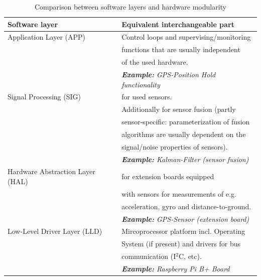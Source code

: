 \begin{table}[H]	
	\begin{tabular}{l|l}
		\hline
		\textbf{Software layer} 					& \textbf{Equivalent interchangeable part} \\
		\hline
		Application Layer (APP) 					& Control loops and supervising/monitoring\\
																			& functions that are usually independent\\
																			& of the used hardware.\\
																			& \textit{\textbf{Example:} GPS-Position Hold functionality}\\
		\hline
		Signal Processing (SIG) 					& \textemphs{Signal conditioning} for used sensors. \\
																			& Additionally for sensor fusion (partly \\
																			& sensor-specific: parameterization of fusion\\
																			& algorithms are usually dependent on the\\
																			& signal/noise properties of sensors).\\
																			& \textit{\textbf{Example:} Kalman-Filter (sensor fusion)}\\			
		\hline
		Hardware Abstraction Layer (HAL) 	& \textemphs{Drivers} for extension boards equipped\\
																			& with sensors for measurements of e.g. \\
																			& acceleration, gyro and distance-to-ground.\\
																			& \textit{\textbf{Example:} GPS-Sensor (extension board)}\\
		\hline
		Low-Level Driver Layer (LLD) 			& Mircoprocessor platform incl. Operating\\
																			& System (if present) and drivers for bus\\
																			& communication (I$^2$C, etc).\\
																			& \textsl{\textbf{Example:} Raspberry Pi B+ Board}\\
		\hline		
	\end{tabular}
	\caption{Comparison between software layers and hardware modularity}
	\label{tab:layer:hw_sw_comp}
\end{table}


